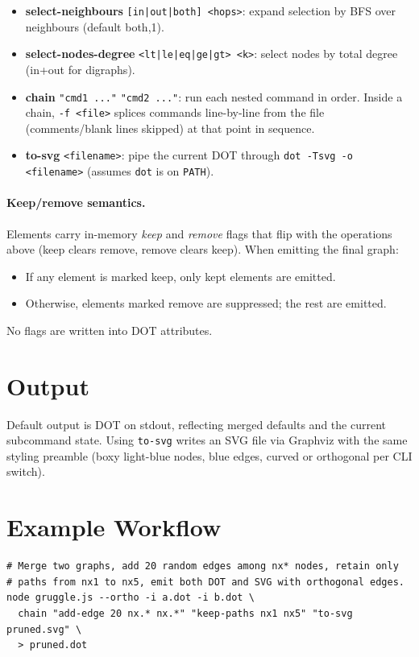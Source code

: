 \documentclass[11pt]{article}
\begin{document}
\begin{itemize}[leftmargin=*]
  \item \textbf{select-neighbours} \texttt{[in|out|both] <hops>}:
        expand selection by BFS over neighbours (default both,1).
  \item \textbf{select-nodes-degree} \texttt{<lt|le|eq|ge|gt> <k>}:
        select nodes by total degree (in+out for digraphs).
  \item \textbf{chain} \texttt{"cmd1 ..."} \texttt{"cmd2 ..."}: run
        each nested command in order. Inside a chain, \texttt{-f
        <file>} splices commands line-by-line from the file
        (comments/blank lines skipped) at that point in sequence.
  \item \textbf{to-svg} \texttt{<filename>}: pipe the current DOT
        through \texttt{dot -Tsvg -o <filename>} (assumes \texttt{dot}
        is on \texttt{PATH}).
\end{itemize}

\paragraph{Keep/remove semantics.}
Elements carry in-memory \emph{keep} and \emph{remove} flags that flip
with the operations above (keep clears remove, remove clears keep).
When emitting the final graph:
\begin{itemize}[leftmargin=*]
  \item If any element is marked keep, only kept elements are emitted.
  \item Otherwise, elements marked remove are suppressed; the rest are
        emitted.
\end{itemize}
No flags are written into DOT attributes.

\section{Output}

Default output is DOT on stdout, reflecting merged defaults and the
current subcommand state.  Using \texttt{to-svg} writes an SVG file
via Graphviz with the same styling preamble (boxy light-blue nodes,
blue edges, curved or orthogonal per CLI switch).

\section{Example Workflow}
\begin{verbatim}
# Merge two graphs, add 20 random edges among nx* nodes, retain only
# paths from nx1 to nx5, emit both DOT and SVG with orthogonal edges.
node gruggle.js --ortho -i a.dot -i b.dot \
  chain "add-edge 20 nx.* nx.*" "keep-paths nx1 nx5" "to-svg pruned.svg" \
  > pruned.dot
\end{verbatim}
\end{document}
